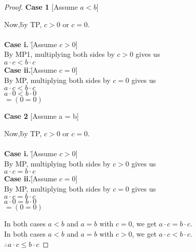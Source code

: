 \documentclass[a4paper]{article}
\newcommand{\bb}{\textbf}
\begin{document}
\begin{flushleft}
\begin{enumerate}
\begin{enumerate}
\begin{proof}
                    \bb{Case 1} [Assume $a < b$] 
                        \begin{tabbing}
                            Now,\= by TP, $c > 0$ or $c = 0$. \\ \\
                            \> \bb{Case i. }\= [Assume $c > 0$] \+ \\
                            \> By MP1, multiplying both sides by $c > 0$ gives us \\
                            \> $a \cdot c < b \cdot c$ \- \\

                            \> \bb{Case ii.}\= [Assume $c = 0$] \+ \\
                            \> By MP, multiplying both sides by $c = 0$ gives us \\
                            \> $a \cdot c < b \cdot c$ \\
                            \> $a \cdot 0 < b \cdot 0$ \\
                            \> $= (0 = 0)$ \\
                        \end{tabbing}

                    \bb{Case 2} [Assume a = b] \\
                        \begin{tabbing}
                            Now,\= by TP, $c > 0$ or $c = 0$. \\ \\
                            \> \bb{Case i. }\= [Assume $c > 0$] \+ \\
                            \> By MP, multiplying both sides by $c > 0$ gives us \\
                            \> $a \cdot c = b \cdot c$ \- \\

                            \> \bb{Case ii.}\= [Assume $c = 0$] \+ \\
                            \> By MP, multiplying both sides by $c = 0$ gives us \\
                            \> $a \cdot c = b \cdot c$ \\
                            \> $a \cdot 0 = b \cdot 0$ \\
                            \> $= (0 = 0)$ \\
                        \end{tabbing}

                In both cases $a < b$ and $a = b$ with $c = 0$, we get $a \cdot c = b \cdot c$.\\
                In both cases $a < b$ and $a = b$ with $c > 0$, we get $a \cdot c < b \cdot c$.\\
                $\therefore a \cdot c\leq b \cdot  c$


                \end{proof}
            \end{enumerate}             
        \end{enumerate}
    \end{flushleft}
\end{document}
